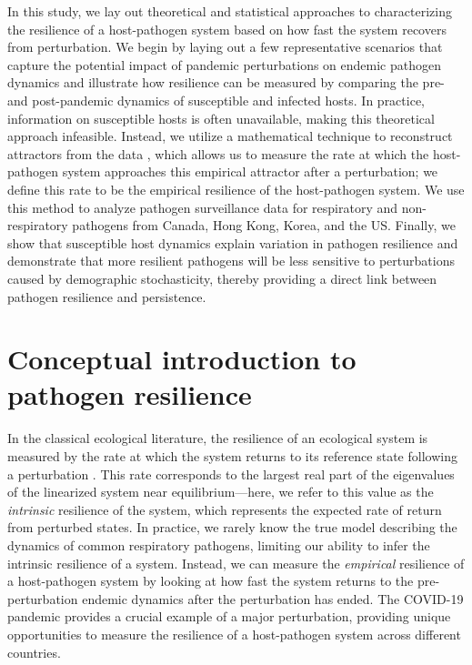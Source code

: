 \documentclass[12pt]{article}
\begin{document}
In this study, we lay out theoretical and statistical approaches to characterizing the resilience of a host-pathogen system based on how fast the system recovers from perturbation.
We begin by laying out a few representative scenarios that capture the potential impact of pandemic perturbations on endemic pathogen dynamics and illustrate how resilience can be measured by comparing the pre- and post-pandemic dynamics of susceptible and infected hosts.
In practice, information on susceptible hosts is often unavailable, making this theoretical approach infeasible.
Instead, we utilize a mathematical technique to reconstruct attractors from the data \citep{takens2006detecting}, which allows us to measure the rate at which the host-pathogen system approaches this empirical attractor after a perturbation;
we define this rate to be the empirical resilience of the host-pathogen system.
We use this method to analyze pathogen surveillance data for respiratory and non-respiratory pathogens from Canada, Hong Kong, Korea, and the US.
Finally, we show that susceptible host dynamics explain variation in pathogen resilience and demonstrate that more resilient pathogens will be less sensitive to perturbations caused by demographic stochasticity, thereby providing a direct link between pathogen resilience and persistence. 
 
\section*{Conceptual introduction to pathogen resilience}

In the classical ecological literature, the resilience of an ecological system is measured by the rate at which the system returns to its reference state following a perturbation \citep{pimm1979structure, neubert1997alternatives,gunderson2000ecological,dakos2022ecological}.
This rate corresponds to the largest real part of the eigenvalues of the linearized system near equilibrium---here, we refer to this value as the \emph{intrinsic} resilience of the system, which represents the expected rate of return from perturbed states.
In practice, we rarely know the true model describing the dynamics of common respiratory pathogens, limiting our ability to infer the intrinsic resilience of a system.
Instead, we can measure the \emph{empirical} resilience of a host-pathogen system by looking at how fast the system returns to the pre-perturbation endemic dynamics after the perturbation has ended.
The COVID-19 pandemic provides a crucial example of a major perturbation, providing unique opportunities to measure the resilience of a host-pathogen system across different countries. 
\end{document}
